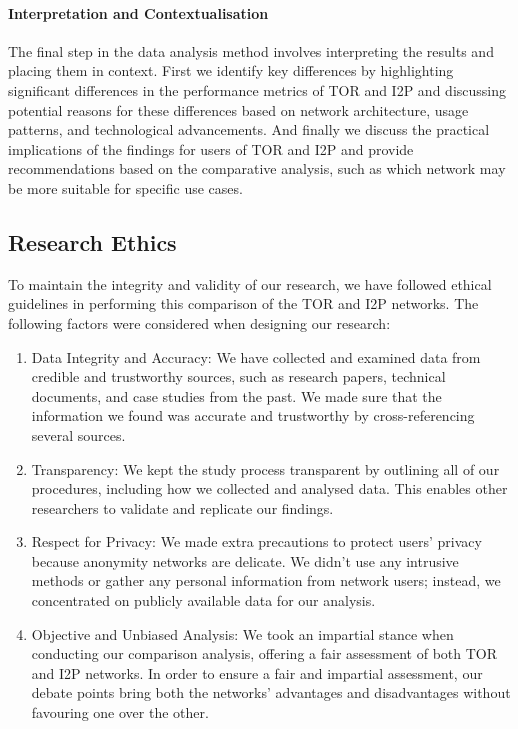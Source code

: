 \documentclass[12pt,conference]{IEEEtran}
\begin{document}
\paragraph{Interpretation and Contextualisation}
The final step in the data analysis method involves interpreting the results and placing them in context. First we identify key differences by highlighting significant differences in the performance metrics of TOR and I2P and discussing potential reasons for these differences based on network architecture, usage patterns, and technological advancements. And finally we discuss the practical implications of the findings for users of TOR and I2P and provide recommendations based on the comparative analysis, such as which network may be more suitable for specific use cases.

\subsection{Research Ethics}
To maintain the integrity and validity of our research, we have followed ethical guidelines in performing this comparison of the TOR and I2P networks. The following factors were considered when designing our research: 
\begin{enumerate}
	\item Data Integrity and Accuracy: We have collected and examined data from credible and trustworthy sources, such as research papers, technical documents, and case studies from the past. We made sure that the information we found was accurate and trustworthy by cross-referencing several sources.
	\item Transparency: We kept the study process transparent by outlining all of our procedures, including how we collected and analysed data. This enables other researchers to validate and replicate our findings.
	\item Respect for Privacy: We made extra precautions to protect users' privacy because anonymity networks are delicate. We didn't use any intrusive methods or gather any personal information from network users; instead, we concentrated on publicly available data for our analysis.
	\item Objective and Unbiased Analysis: We took an impartial stance when conducting our comparison analysis, offering a fair assessment of both TOR and I2P networks. In order to ensure a fair and impartial assessment, our debate points bring both the networks' advantages and disadvantages without favouring one over the other.
\end{enumerate}
\end{document}
